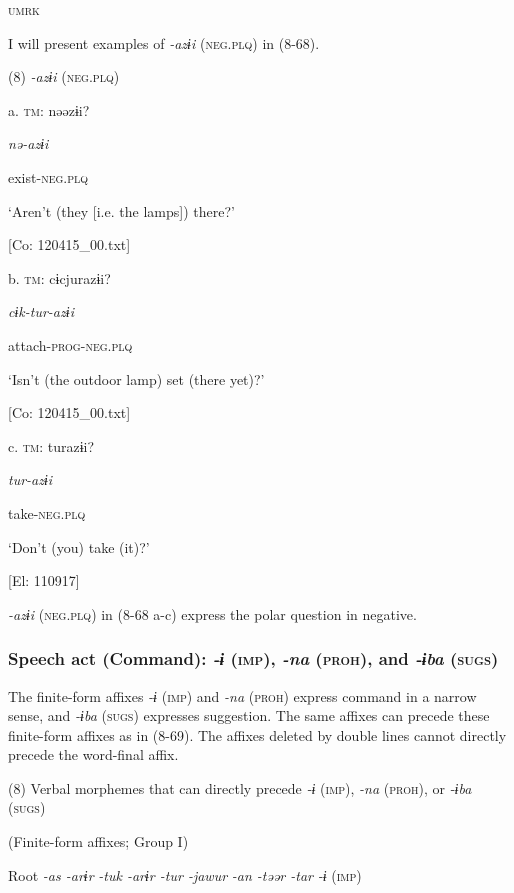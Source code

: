           \textsc{umrk}

I will present examples of \textit{{}-azɨi} (\textsc{neg}.\textsc{plq}) in (8-68).

(8)  \textit{{}-azɨi} (\textsc{neg}.\textsc{plq})

  a.  \textsc{tm}:  nəəzɨi?

      \textit{nə-azɨi}

      exist-\textsc{neg}.\textsc{plq}

      ‘Aren’t (they [i.e. the lamps]) there?’

      [Co: 120415\_00.txt]

  b.  \textsc{tm}:  cɨcjurazɨi?

      \textit{cɨk-tur-azɨi}

      attach-\textsc{prog}-\textsc{neg}.\textsc{plq}

      ‘Isn’t (the outdoor lamp) set (there yet)?’

      [Co: 120415\_00.txt]

  c.  \textsc{tm}:  turazɨi?

      \textit{tur-azɨi}

      take-\textsc{neg}.\textsc{plq}

      ‘Don’t (you) take (it)?’

      [El: 110917]

\textit{{}-azɨi} (\textsc{neg}.\textsc{plq}) in (8-68 a-c) express the polar question in negative.

\subsubsection{Speech act (Command): \textit{{}-ɨ} (\textsc{imp}), \textit{{}-na} (\textsc{proh}), and \textit{{}-ɨba} (\textsc{sugs})}

The finite-form affixes \textit{{}-ɨ} (\textsc{imp}) and \textit{{}-na} (\textsc{proh}) express command in a narrow sense, and \textit{{}-ɨba} (\textsc{sugs}) expresses suggestion. The same affixes can precede these finite-form affixes as in (8-69). The affixes deleted by double lines cannot directly precede the word-final affix.

(8)  Verbal morphemes that can directly precede \textit{-ɨ} (\textsc{imp}), \textit{{}-na} (\textsc{proh}), or \textit{{}-ɨba} (\textsc{sugs})

(Finite-form affixes; Group I)

  Root  \textit{{}-as  {}-arɨr} %
\textit{{}-tuk  {}-arɨr  {}-tur  {}-jawur} %
\textit{{}-an  {}-təər  {}-tar} %
\textit{{}-ɨ} (\textsc{imp})

